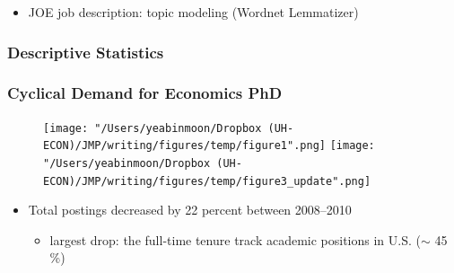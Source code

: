 \documentclass[10pt,svgnames,fragile]{beamer}
\begin{document}
{\begin{frame}
\begin{itemize}
	
			\item JOE job description: topic modeling (Wordnet Lemmatizer) 
	\end{itemize}
\end{frame}


\begin{frame}
		\frametitle{Descriptive Statistics}
		
	\end{frame}


\begin{frame}
	\frametitle{Cyclical Demand for Economics PhD}
	
	\begin{figure}
		\centering
		\texttt{[image: "/Users/yeabinmoon/Dropbox (UH-ECON)/JMP/writing/figures/temp/figure1".png]} 
		\texttt{[image: "/Users/yeabinmoon/Dropbox (UH-ECON)/JMP/writing/figures/temp/figure3\_update".png]} 
	\end{figure}
	

	\begin{itemize}	
		\item Total postings decreased by 22 percent between 2008--2010
		\vspace{2 mm}
		\begin{itemize}
			\item largest drop: the full-time tenure track academic positions in U.S. ($\sim$ 45 \%)
		\end{itemize}
	\end{itemize}
\end{frame}
}
\end{document}
